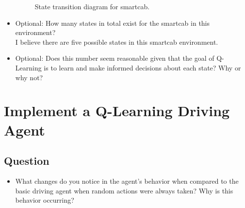 \documentclass[twoside,openright,titlepage,numbers=noenddot,headinclude,%
               footinclude=true,cleardoublepage=empty,abstractoff,BCOR=5mm,%
               paper=a4,fontsize=11pt,ngerman,american]{scrreprt}
\numberwithin{theorem}{chapter}
\numberwithin{definition}{chapter}
\numberwithin{algorithm}{chapter}
\numberwithin{figure}{chapter}
\numberwithin{table}{chapter}
\numberwithin{equation}{chapter}
\begin{document}
\begin{itemize}
\begin{figure}
\caption{State transition diagram for smartcab.}\label{fig:greenLight}
\end{figure}



\item Optional: How many states in total exist for the smartcab in this environment? \\ I believe there are five possible states in this smartcab environment.

\item Optional: Does this number seem reasonable given that the goal of Q-Learning is to learn and make informed decisions about each state? Why or why not?
\end{itemize}





%
%

\chapter*{Implement a Q-Learning Driving Agent}

\section*{Question}

\begin{itemize}
\item What changes do you notice in the agent's behavior when compared to the basic driving agent when random actions were always taken? Why is this behavior occurring?

\end{itemize}


%
%
\end{document}
